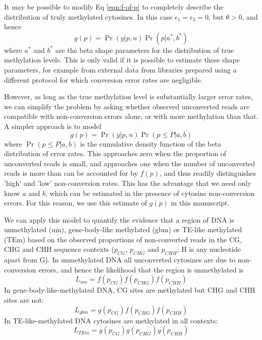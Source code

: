 \documentclass[10pt,letterpaper]{article}
\begin{document}
It may be possible to modify Eq \ref{eqn:f-of-p} to completely describe the distribution of truly methylated cytosines.
In this case $\epsilon_1=\epsilon_2=0$, but $\theta>0$, and hence
\begin{equation}
    g(p) = \Pr(y | p, n) \Pr(p | a^*,b^*)
\end{equation}
where $a^*$ and $b^*$ are the beta shape parameters for the distribution of true methylation levels.
This is only valid if it is possible to estimate these shape parameters, for example from external data from libraries prepared using a different protocol for which conversion error rates are negligible.

However, as long as the true methylation level is substantially larger error rates, we can simplify the problem by asking whether observed unconverted reads are compatible with non-conversion errors alone, or with more methylation than that.
A simpler approach is to model 
\begin{equation}
    g(p) = \Pr(y | p, n) \Pr(p \leq P | a,b)
\end{equation}
where $\Pr(p \leq P | a,b)$ is the cumulative density function of the beta distribution of error rates.
This approaches zero when the proportion of unconverted reads is small, and approaches one when the number of unconverted reads is more than can be accounted for by $f(p)$, and thus readily distinguishes 'high' and 'low' non-conversion rates.
This has the advantage that we need only know $a$ and $b$, which can be estimated in the presence of cytosine non-conversion errors.
For this reason, we use this estimate of $g(p)$ in this manuscript.

We can apply this model to quantify the evidence that a region of DNA is unmethylated (um), gene-body-like methylated (gbm) or TE-like methylated (TEm) based on the observed proportions of non-converted reads in the CG, CHG and CHH sequence contexts ($p_{CG}$, $p_{CHG}$ and $p_{CHH}$; H is any nucleotide apart from G).
In unmethylated DNA all unconverted cytosines are due to non-conversion errors, and hence the likelihood that the region is unmethylated is
\begin{equation}
    L_{um} = f(p_{CG}) f(p_{CHG}) f(p_{CHH})
\end{equation}
In gene-body-like-methylated DNA, CG sites are methylated but CHG and CHH sites are not: 
\begin{equation}
    L_{gbm} = g(p_{CG}) f(p_{CHG}) f(p_{CHH})
\end{equation}
In TE-like-methylated DNA cytosines are methylated in all contexts:
\begin{equation}
    L_{TEm} = g(p_{CG}) g(p_{CHG}) g(p_{CHH})
\end{equation}
\end{document}
